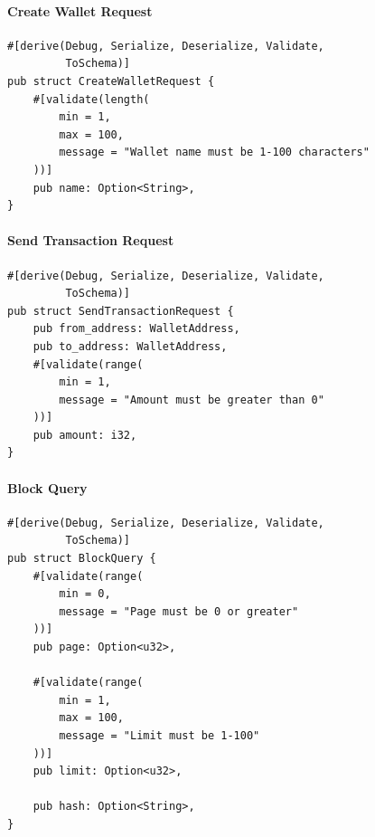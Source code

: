 \paragraph{Create Wallet Request}

\begin{listing}[H]
\caption{Create wallet request with validation}
\label{lst:models-create-wallet-request}
\begin{verbatim}
#[derive(Debug, Serialize, Deserialize, Validate,
         ToSchema)]
pub struct CreateWalletRequest {
    #[validate(length(
        min = 1,
        max = 100,
        message = "Wallet name must be 1-100 characters"
    ))]
    pub name: Option<String>,
}
\end{verbatim}
\end{listing}

\paragraph{Send Transaction Request}

\begin{listing}[H]
\caption{Send transaction request with validation}
\label{lst:models-send-tx-request}
\begin{verbatim}
#[derive(Debug, Serialize, Deserialize, Validate,
         ToSchema)]
pub struct SendTransactionRequest {
    pub from_address: WalletAddress,
    pub to_address: WalletAddress,
    #[validate(range(
        min = 1,
        message = "Amount must be greater than 0"
    ))]
    pub amount: i32,
}
\end{verbatim}
\end{listing}

\paragraph{Block Query}

\begin{listing}[H]
\caption{Block query parameters with validation}
\label{lst:models-block-query}
\begin{verbatim}
#[derive(Debug, Serialize, Deserialize, Validate,
         ToSchema)]
pub struct BlockQuery {
    #[validate(range(
        min = 0,
        message = "Page must be 0 or greater"
    ))]
    pub page: Option<u32>,

    #[validate(range(
        min = 1,
        max = 100,
        message = "Limit must be 1-100"
    ))]
    pub limit: Option<u32>,

    pub hash: Option<String>,
}
\end{verbatim}
\end{listing}

